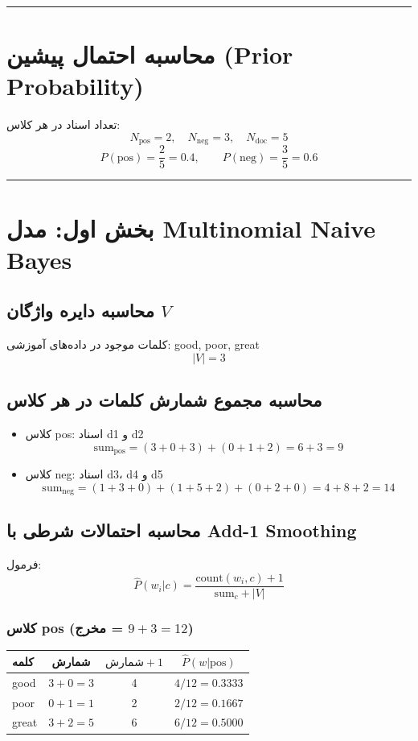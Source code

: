 \documentclass[11pt,a4paper]{article}
\newcommand{\en}[1]{\textenglish{#1}}
\newcommand{\separator}{\vspace{1em}\noindent\rule{\linewidth}{0.4pt}\vspace{1em}}
\begin{document}
\separator
\section{محاسبه احتمال پیشین (\en{Prior Probability})}
تعداد اسناد در هر کلاس:
\[
N_{\text{pos}} = 2, \quad N_{\text{neg}} = 3, \quad N_{\text{doc}} = 5
\]
\[
P(\text{pos}) = \frac{2}{5} = 0.4, \qquad P(\text{neg}) = \frac{3}{5} = 0.6
\]

\separator
\section{بخش اول: مدل \en{Multinomial Naive Bayes}}

\subsection*{محاسبه دایره واژگان $V$}
کلمات موجود در داده‌های آموزشی: \en{good, poor, great}
\[
|V| = 3
\]

\subsection*{محاسبه مجموع شمارش کلمات در هر کلاس}
\begin{itemize}
\item کلاس \en{pos}: اسناد \en{d1} و \en{d2}
\[
\text{sum}_{\text{pos}} = (3+0+3) + (0+1+2) = 6 + 3 = 9
\]
\item کلاس \en{neg}: اسناد \en{d3}، \en{d4} و \en{d5}
\[
\text{sum}_{\text{neg}} = (1+3+0) + (1+5+2) + (0+2+0) = 4 + 8 + 2 = 14
\]
\end{itemize}

\subsection*{محاسبه احتمالات شرطی با \en{Add-1 Smoothing}}
فرمول:
\[
\hat{P}(w_i|c) = \frac{\text{count}(w_i,c) + 1}{\text{sum}_c + |V|}
\]

\subsubsection*{کلاس \en{pos} (مخرج = $9 + 3 = 12$)}
\begin{center}
\begin{tabular}{|l|c|c|c|}
\hline
\textbf{کلمه} & \textbf{شمارش} & $\text{شمارش} + 1$ & $\hat{P}(w|\text{pos})$ \\
\hline
\en{good} & $3 + 0 = 3$ & 4 & $4/12 = 0.3333$ \\
\hline
\en{poor} & $0 + 1 = 1$ & 2 & $2/12 = 0.1667$ \\
\hline
\en{great} & $3 + 2 = 5$ & 6 & $6/12 = 0.5000$ \\
\hline
\end{tabular}
\end{center}
\end{document}
